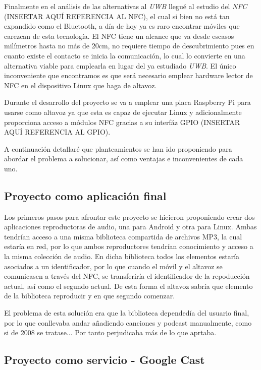 Finalmente en el análisis de las alternativas al \emph{UWB} llegué al estudio
del \emph{NFC} (INSERTAR AQUÍ REFERENCIA AL NFC), el cual si bien no está tan
expandido como el Bluetooth, a día de hoy ya es raro encontrar móviles que
carezcan de esta tecnología. El NFC tiene un alcance que va desde escasos
milímetros hasta no más de 20cm, no requiere tiempo de descubrimiento pues en
cuanto existe el contacto se inicia la comunicación, lo cual lo convierte en una
alternativa viable para emplearla en lugar del ya estudiado \emph{UWB}. El único
inconveniente que encontramos es que será necesario emplear hardware lector de
NFC en el dispositivo Linux que haga de altavoz.

Durante el desarrollo del proyecto se va a emplear una placa Raspberry Pi para
usarse como altavoz ya que esta es capaz de ejecutar Linux y adicionalmente
proporciona acceso a módulos NFC gracias a su interfáz GPIO (INSERTAR AQUÍ
REFERENCIA AL GPIO).

A continuación detallaré que planteamientos se han ido proponiendo para abordar el
problema a solucionar, así como ventajas e inconvenientes de cada uno.

\subsection{Proyecto como aplicación final}

Los primeros pasos para afrontar este proyecto se hicieron proponiendo crear dos
aplicaciones reproductoras de audio, una para Android y otra para Linux. Ambas
tendrían acceso a una misma biblioteca compartida de archivos MP3, la cual
estaría en red, por lo que ambos reproductores tendrían conocimiento y acceso a
la misma colección de audio. En dicha biblioteca todos los elementos estaría
asociados a un identificador, por lo que cuando el móvil y el altavoz se
comunicasen a través del NFC, se transferiría el identificador de la repoducción
actual, así como el segundo actual. De esta forma el altavoz sabría que elemento
de la biblioteca reproducir y en que segundo comenzar.

El problema de esta solución era que la biblioteca dependedía del usuario final,
por lo que conllevaba andar añadiendo canciones y podcast manualmente, como si
de 2008 se tratase... Por tanto perjudicaba más de lo que aprtaba.

\subsection{Proyecto como servicio - Google Cast}

